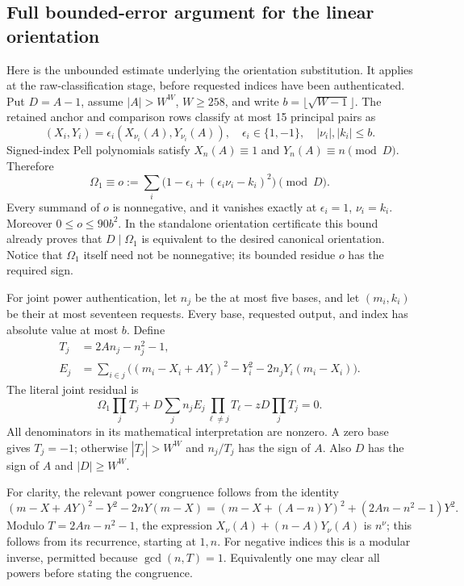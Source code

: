 \documentclass[10pt,letterpaper]{article}
\theoremstyle{remark}\newtheorem{remark}[theorem]{Remark}
\begin{document}


\subsection{Full bounded-error argument for the linear orientation}

Here is the unbounded estimate underlying the orientation substitution.
It applies at the raw-classification stage, before requested indices have
been authenticated. Put $D=A-1$, assume $|A|>W^W$, $W\ge258$, and write
$b=\lfloor\sqrt{W-1}\rfloor$. The retained anchor and comparison rows
classify at most 15 principal pairs as
\[
 (X_i,Y_i)=\epsilon_i(X_{\nu_i}(A),Y_{\nu_i}(A)),
 \quad\epsilon_i\in\{1,-1\},\quad |\nu_i|,|k_i|\le b.
\]
Signed-index Pell polynomials satisfy $X_n(A)\equiv1$ and
$Y_n(A)\equiv n\pmod D$. Therefore
\[
 \Omega_1\equiv o:=\sum_i
       \bigl(1-\epsilon_i+(\epsilon_i\nu_i-k_i)^2\bigr)\pmod D.
\]
Every summand of $o$ is nonnegative, and it vanishes exactly at
$\epsilon_i=1$, $\nu_i=k_i$. Moreover $0\le o\le90b^2$.
In the standalone orientation certificate this bound already proves that
$D\mid\Omega_1$ is equivalent to the desired canonical orientation.
Notice that $\Omega_1$ itself need not be nonnegative; its bounded residue
$o$ has the required sign.

For joint power authentication, let $n_j$ be the at most five bases,
and let $(m_i,k_i)$ be their at most seventeen requests. Every base,
requested output, and index has absolute value at most $b$. Define
\begin{align*}
 T_j&=2An_j-n_j^2-1,\\
 E_j&=\sum_{i\in j}\bigl((m_i-X_i+AY_i)^2-Y_i^2
                    -2n_jY_i(m_i-X_i)\bigr).
\end{align*}
The literal joint residual is
\begin{equation}\label{eq:jointlinear}
 \Omega_1\prod_jT_j
 +D\sum_j n_jE_j\prod_{\ell\ne j}T_\ell
 -zD\prod_jT_j=0.
\end{equation}
All denominators in its mathematical interpretation are nonzero. A zero
base gives $T_j=-1$; otherwise $|T_j|>W^W$ and $n_j/T_j$ has the sign
of $A$. Also $D$ has the sign of $A$ and $|D|\ge W^W$.

For clarity, the relevant power congruence follows from the identity
\[
 (m-X+AY)^2-Y^2-2nY(m-X)
   =(m-X+(A-n)Y)^2+(2An-n^2-1)Y^2.
\]
Modulo $T=2An-n^2-1$, the expression $X_{\nu}(A)+(n-A)Y_{\nu}(A)$
is $n^{\nu}$; this follows from its recurrence, starting at $1,n$.
For negative indices this is a modular inverse, permitted because
$\gcd(n,T)=1$. Equivalently one may clear all powers before stating the
congruence.
\end{document}
